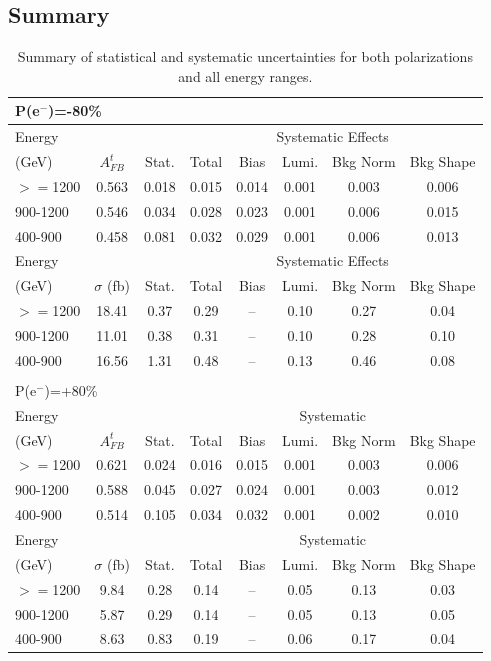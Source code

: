 \subsection{Summary}
\begin{table}
  \centering
  \begin{tabular}{l|c|c|c|c|c|c|c}
    \toprule
    \midrule
    \multicolumn{8}{l}{P(e$^-$)=-80\%} \\
    \midrule
    \midrule
   Energy &  &  &     \multicolumn{5}{c}{Systematic Effects} \\
    (GeV) & $A_{FB}^t$ & Stat. & Total & Bias & Lumi. & Bkg Norm & Bkg Shape\\
    \midrule
    $>=$1200   & 0.563 & 0.018 & 0.015 & 0.014 & 0.001 & 0.003 & 0.006\\
    \midrule
    900-1200   & 0.546 & 0.034 & 0.028 & 0.023 & 0.001 & 0.006 & 0.015\\
    \midrule
    400-900    & 0.458 & 0.081 & 0.032 & 0.029 & 0.001 & 0.006 & 0.013\\
    \midrule
    \midrule
    Energy &  &   &     \multicolumn{5}{c}{Systematic Effects} \\
    (GeV) & $\sigma$ (fb) & Stat. & Total & Bias & Lumi. & Bkg Norm & Bkg Shape\\
    \midrule
    $>=$1200   & 18.41 & 0.37 & 0.29 & -- & 0.10 & 0.27 & 0.04\\
    \midrule
    900-1200   & 11.01 & 0.38 & 0.31 & -- & 0.10 & 0.28 & 0.10\\
    \midrule
    400-900    & 16.56 & 1.31 & 0.48 & -- & 0.13 & 0.46 & 0.08\\
    \midrule
    \multicolumn{8}{c}{}\\
    \midrule
    \midrule
    \multicolumn{8}{l}{ P(e$^-$)=+80\%}\\
    \midrule
    \midrule
   Energy &  &   &     \multicolumn{5}{c}{Systematic} \\
    (GeV) & $A_{FB}^t$ & Stat. & Total & Bias & Lumi. & Bkg Norm & Bkg Shape\\
    \midrule
    $>=$1200   & 0.621 & 0.024 & 0.016 & 0.015 & 0.001 & 0.003 & 0.006\\
    \midrule
    900-1200   & 0.588 & 0.045 & 0.027 & 0.024 & 0.001 & 0.003 & 0.012\\
    \midrule
    400-900    & 0.514 & 0.105 & 0.034 & 0.032 & 0.001 & 0.002 & 0.010\\
    \midrule
    \midrule
    Energy &  &   &     \multicolumn{5}{c}{Systematic} \\
    (GeV) & $\sigma$ (fb) & Stat. & Total & Bias & Lumi. & Bkg Norm & Bkg Shape\\
    \midrule
    $>=$1200   & 9.84 & 0.28 & 0.14 & -- & 0.05 & 0.13 & 0.03\\
    \midrule
    900-1200   & 5.87 & 0.29 & 0.14 & -- & 0.05 & 0.13 & 0.05\\
    \midrule
    400-900    & 8.63 & 0.83 & 0.19 & -- & 0.06 & 0.17 & 0.04\\
    \bottomrule
  \end{tabular}
  \caption{Summary of statistical and systematic uncertainties for both polarizations and all energy ranges.}
  \label{finaltable}
\end{table}

